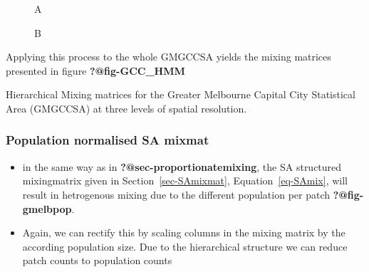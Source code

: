 \documentclass[
  letterpaper,
  DIV=11,
  numbers=noendperiod]{scrartcl}
\begin{document}
\begin{figure}

\begin{minipage}[t]{0.50\linewidth}

{\centering 


\caption{\label{fig-GMelb_eg-1}A}

}

\end{minipage}%
%
\begin{minipage}[t]{0.50\linewidth}

{\centering 


\caption{\label{fig-GMelb_eg-2}B}

}

\end{minipage}%

\end{figure}

Applying this process to the whole GMGCCSA yields the mixing matrices
presented in figure \textbf{?@fig-GCC\_HMM}

\begin{figure}

\end{figure}

Hierarchical Mixing matrices for the Greater Melbourne Capital City
Statistical Area (GMGCCSA) at three levels of spatial resolution.

\hypertarget{population-normalised-sa-mixmat}{%
\subsubsection{Population normalised SA
mixmat}\label{population-normalised-sa-mixmat}}

\begin{figure}

\end{figure}

\begin{itemize}
\item
  in the same way as in \textbf{?@sec-proportionatemixing}, the SA
  structured mixingmatrix given in Section~\ref{sec-SAmixmat},
  Equation~\ref{eq-SAmix}, will result in hetrogenous mixing due to the
  different population per patch \textbf{?@fig-gmelbpop}.
\item
  Again, we can rectify this by scaling columns in the mixing matrix by
  the according population size. Due to the hierarchical structure we
  can reduce patch counts to population counts
\end{itemize}
\end{document}

